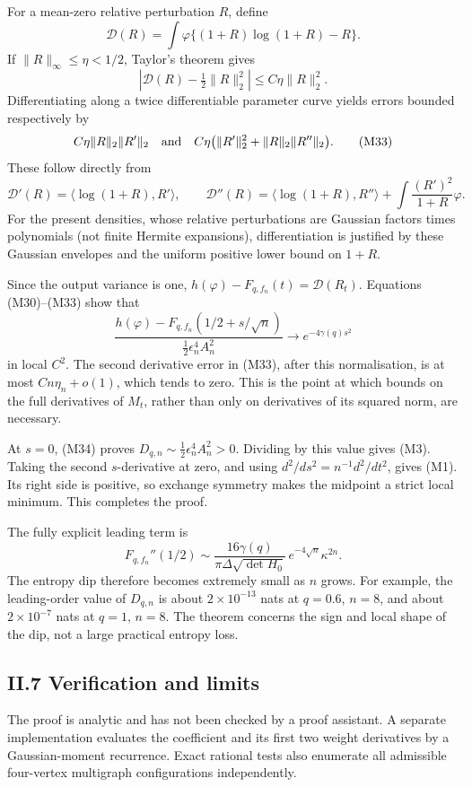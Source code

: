 \documentclass[
  british,
  10pt,
]{article}
\begin{document}
For a mean-zero relative perturbation \(R\), define \[
\mathcal D(R)=\int\varphi\{(1+R)\log(1+R)-R\}.
\] If \(\|R\|_\infty\le\eta<1/2\), Taylor's theorem gives \[
\left|\mathcal D(R)-\tfrac12\|R\|_2^2\right|
\le C\eta\|R\|_2^2.
\] Differentiating along a twice differentiable parameter curve yields
errors bounded respectively by \[
C\eta\|R\|_2\|R'\|_2
\quad\hbox{and}\quad
C\eta\bigl(\|R'\|_2^2+\|R\|_2\|R''\|_2\bigr).
\tag{M33}
\] These follow directly from \[
\mathcal D'(R)=\langle\log(1+R),R'\rangle,\qquad
\mathcal D''(R)=
\langle\log(1+R),R''\rangle+
\int\frac{(R')^2}{1+R}\varphi.
\] For the present densities, whose relative perturbations are Gaussian
factors times polynomials (not finite Hermite expansions),
differentiation is justified by these Gaussian envelopes and the uniform
positive lower bound on \(1+R\).

Since the output variance is one,
\(h(\varphi)-F_{q,f_n}(t)=\mathcal D(R_t)\). Equations (M30)--(M33) show
that \[
\frac{h(\varphi)-F_{q,f_n}(1/2+s/\sqrt n)}
     {\tfrac12\epsilon_n^4 A_n^2}
\longrightarrow e^{-4\gamma(q)s^2}
\tag{M34}
\] in local \(C^2\). The second derivative error in (M33), after this
normalisation, is at most \(C n\eta_n+o(1)\), which tends to zero. This
is the point at which bounds on the full derivatives of \(M_t\), rather
than only on derivatives of its squared norm, are necessary.

At \(s=0\), (M34) proves \(D_{q,n}\sim\tfrac12\epsilon_n^4 A_n^2>0\).
Dividing by this value gives (M3). Taking the second \(s\)-derivative at
zero, and using \(d^2/ds^2=n^{-1}d^2/dt^2\), gives (M1). Its right side
is positive, so exchange symmetry makes the midpoint a strict local
minimum. This completes the proof.

The fully explicit leading term is \[
F_{q,f_n}''(1/2)
\sim
\frac{16\gamma(q)}
{\pi\Delta\sqrt{\det H_0}}\,
e^{-4\sqrt n}\kappa^{2n}.
\tag{M35}
\] The entropy dip therefore becomes extremely small as \(n\) grows. For
example, the leading-order value of \(D_{q,n}\) is about
\(2\times10^{-13}\) nats at \(q=0.6\), \(n=8\), and about
\(2\times10^{-7}\) nats at \(q=1\), \(n=8\). The theorem concerns the
sign and local shape of the dip, not a large practical entropy loss.

\subsection{II.7 Verification and
limits}\label{ii.7-verification-and-limits}

The proof is analytic and has not been checked by a proof assistant. A
separate implementation evaluates the coefficient and its first two
weight derivatives by a Gaussian-moment recurrence. Exact rational tests
also enumerate all admissible four-vertex multigraph configurations
independently.
\end{document}
